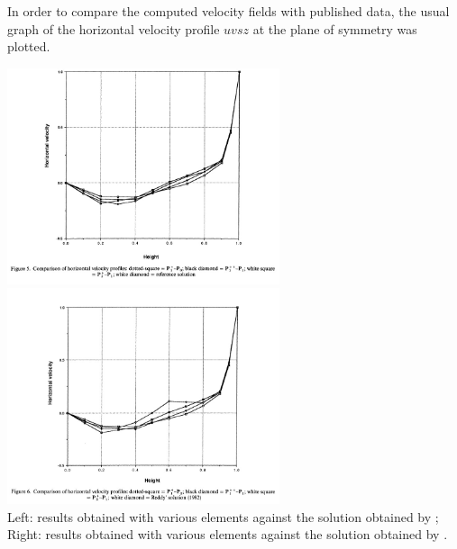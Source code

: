 In order to compare the computed velocity fields with published data, the usual graph of the
horizontal velocity profile $u vs z$ at the plane of symmetry was plotted.
\begin{center}
\includegraphics[width=8cm]{images/benchmark_liddriven3D/res1}
\includegraphics[width=8cm]{images/benchmark_liddriven3D/res2}\\
{\captionfont Left: results obtained with various elements against the 
solution obtained by \textcite{rota87}; 
Right: results obtained with various elements against the 
solution obtained by \textcite{redd82}.} 
\end{center}
